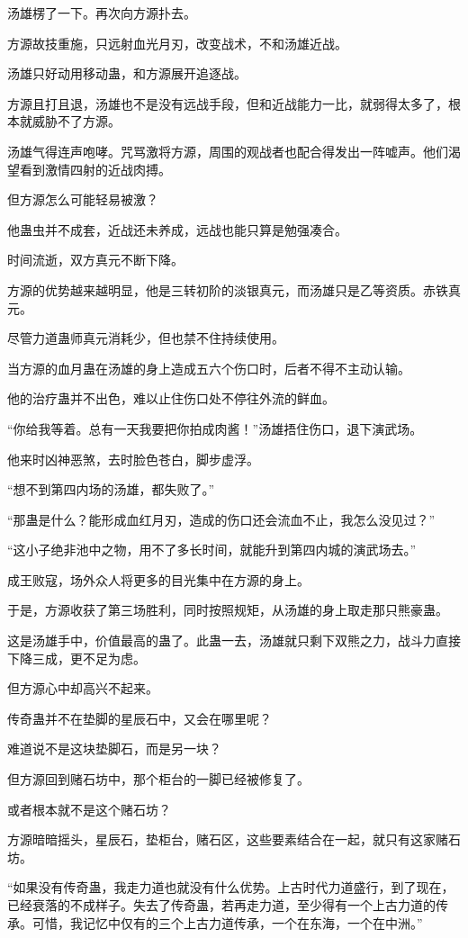 \begin{this_body}
汤雄楞了一下。再次向方源扑去。

方源故技重施，只远射血光月刃，改变战术，不和汤雄近战。

汤雄只好动用移动蛊，和方源展开追逐战。

方源且打且退，汤雄也不是没有远战手段，但和近战能力一比，就弱得太多了，根本就威胁不了方源。

汤雄气得连声咆哮。咒骂激将方源，周围的观战者也配合得发出一阵嘘声。他们渴望看到激情四射的近战肉搏。

但方源怎么可能轻易被激？

他蛊虫并不成套，近战还未养成，远战也能只算是勉强凑合。

时间流逝，双方真元不断下降。

方源的优势越来越明显，他是三转初阶的淡银真元，而汤雄只是乙等资质。赤铁真元。

尽管力道蛊师真元消耗少，但也禁不住持续使用。

当方源的血月蛊在汤雄的身上造成五六个伤口时，后者不得不主动认输。

他的治疗蛊并不出色，难以止住伤口处不停往外流的鲜血。

“你给我等着。总有一天我要把你拍成肉酱！”汤雄捂住伤口，退下演武场。

他来时凶神恶煞，去时脸色苍白，脚步虚浮。

“想不到第四内场的汤雄，都失败了。”

“那蛊是什么？能形成血红月刃，造成的伤口还会流血不止，我怎么没见过？”

“这小子绝非池中之物，用不了多长时间，就能升到第四内城的演武场去。”

成王败寇，场外众人将更多的目光集中在方源的身上。

于是，方源收获了第三场胜利，同时按照规矩，从汤雄的身上取走那只熊豪蛊。

这是汤雄手中，价值最高的蛊了。此蛊一去，汤雄就只剩下双熊之力，战斗力直接下降三成，更不足为虑。

但方源心中却高兴不起来。

传奇蛊并不在垫脚的星辰石中，又会在哪里呢？

难道说不是这块垫脚石，而是另一块？

但方源回到赌石坊中，那个柜台的一脚已经被修复了。

或者根本就不是这个赌石坊？

方源暗暗摇头，星辰石，垫柜台，赌石区，这些要素结合在一起，就只有这家赌石坊。

“如果没有传奇蛊，我走力道也就没有什么优势。上古时代力道盛行，到了现在，已经衰落的不成样子。失去了传奇蛊，若再走力道，至少得有一个上古力道的传承。可惜，我记忆中仅有的三个上古力道传承，一个在东海，一个在中洲。”


\end{this_body}
